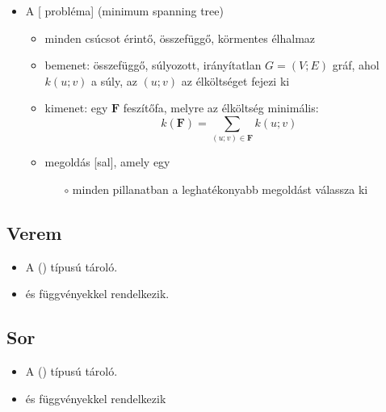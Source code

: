 \documentclass[../../main.tex]{subfiles}
\begin{document}
\begin{itemize}
	\item A [ probléma]
	      (minimum spanning tree)
	      \begin{itemize}
		      \item minden csúcsot érintő, összefüggő,
		            körmentes élhalmaz

		      \item bemenet: összefüggő, súlyozott,
		            irányítatlan $G = (V; E)$ gráf, ahol $k(u; v)$
		            a súly, az $(u;v)$ az élköltséget fejezi ki

		      \item kimenet: egy $\mathbf{F}$ feszítőfa,
		            melyre az élköltség minimális:
		            \[k(\mathbf{F}) = \sum_{(u;v) \in \mathbf{F}} k(u;v)\]
		      \item megoldás [sal], amely egy
		            \begin{itemize}
			            \item[$\circ$] minden pillanatban a leghatékonyabb megoldást válassza ki
		            \end{itemize}
	      \end{itemize}
\end{itemize}

\subsection{Verem}

\begin{itemize}
	\item A  () 
	      típusú tároló.

	\item {} és  függvényekkel rendelkezik.
\end{itemize}

\subsection{Sor}

\begin{itemize}
	\item A  () 
	      típusú tároló.

	\item {} és  függvényekkel rendelkezik
\end{itemize}
\end{document}
